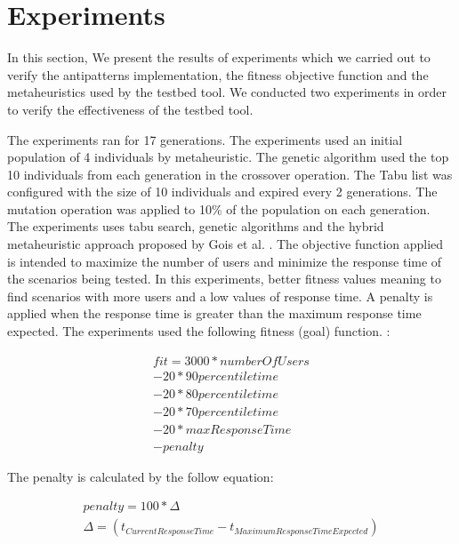\documentclass[times]{stvrauth}
\begin{document}
\FloatBarrier
\section{Experiments}

In this section, We present the results of experiments which we carried out to verify the antipatterns  implementation, the fitness objective function and the metaheuristics used by the testbed tool. We conducted two experiments in order to verify the effectiveness of the testbed tool.

The experiments ran for 17 generations. The experiments used an initial population of 4 individuals by metaheuristic. The genetic algorithm used the top 10 individuals from each generation in the crossover operation. The Tabu list was configured with the size of 10 individuals and expired every 2 generations.  The mutation operation was applied to 10\% of the population on each generation. The experiments uses tabu search, genetic algorithms and the hybrid metaheuristic approach proposed by Gois et al. \cite{Gois2016}. The objective function applied is intended to maximize the number of users and minimize the response time of the scenarios being tested.  In this experiments, better fitness values meaning to find scenarios with more users and a low values of response time. A penalty is applied when the response time is greater than the  maximum response time expected. The experiments used the following fitness (goal) function. :

\begin{equation}
\begin{aligned}
fit=3000*numberOfUsers\\
-20* 90percentiletime\\
-20*80percentiletime\\
-20*70percentiletime\\
-20*maxResponseTime\\
-penalty
\end{aligned}
\end{equation}

The penalty is calculated by the follow equation:

\begin{equation}
\begin{aligned}
penalty=100 * \Delta \\
\Delta=(t_{Current Response Time} - t_{Maximum Response Time Expected})\\
\end{aligned}
\end{equation}
\end{document}
